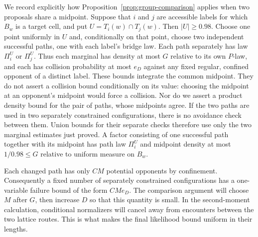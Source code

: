We record explicitly how Proposition~\ref{prop:group-comparison}
applies when two proposals share a midpoint.  Suppose that $i$ and $j$
are accessible labels for which $B_w$ is a target cell, and put
$U=T_i(w)\cap T_j(w)$.  Then $|U|\ge0.98$.  Choose one point uniformly
in $U$ and, conditionally on that point, choose two independent
successful paths, one with each label's bridge law.  Each path separately
has law $\Pi_i^U$ or $\Pi_j^U$.  Thus each marginal has density at most
$G$ relative to its own $P$-law, and each has collision probability at
most $e_D$ against any fixed regular, confined opponent of a distinct
label.  These bounds integrate the common midpoint.  They do not assert
a collision bound conditionally on its value: choosing the midpoint at
an opponent's midpoint would force a collision.  Nor do we assert a
product density bound for the pair of paths, whose midpoints agree.
If the two paths are used in two separately constrained configurations,
there is no avoidance check between them.  Union bounds for their
separate checks therefore use only the two marginal estimates just
proved.  A factor consisting of one successful path together with its
midpoint has path law $\Pi_i^U$ and midpoint density at most
$1/0.98\le G$ relative to uniform measure on $B_w$.

Each changed path has only $CM$ potential opponents by confinement.
Consequently a fixed number of separately constrained configurations has a
one-variable failure bound of the form $CMe_D$.  The comparison
argument will choose $M$ after $G$, then increase $D$ so that this
quantity is small. In the second-moment calculation, conditional
normalizers will cancel away from encounters between the two lattice
routes. This is what makes the final likelihood bound uniform in their
lengths.
